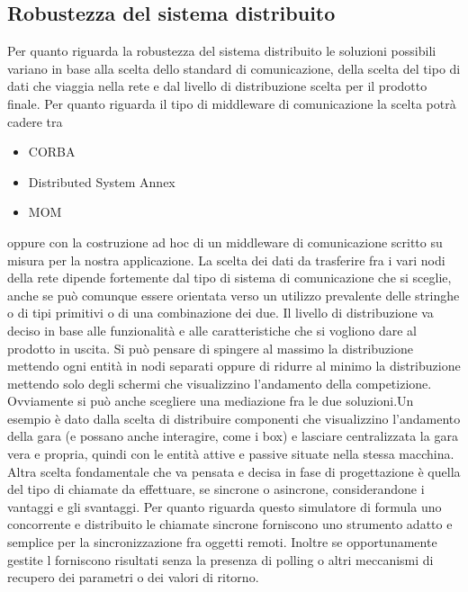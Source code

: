 \subsection{Robustezza del sistema distribuito }
Per quanto riguarda la robustezza del sistema distribuito le soluzioni possibili
variano in base alla scelta dello standard di comunicazione, della scelta del
tipo di dati che viaggia nella rete e dal livello di distribuzione scelta per il
prodotto finale.
Per quanto riguarda il tipo di middleware di comunicazione la scelta potr\`{a}
cadere tra 
\begin{itemize}
\item CORBA
\item Distributed System Annex 
\item MOM
\end{itemize}
oppure con la costruzione ad hoc di un middleware di comunicazione scritto su
misura per la nostra applicazione.
La scelta dei dati da trasferire fra i vari nodi della rete dipende fortemente
dal tipo di sistema di comunicazione che si sceglie, anche se può comunque
essere orientata verso un utilizzo prevalente delle stringhe o di tipi primitivi
o di una combinazione dei due. Il livello di distribuzione va deciso in base
alle funzionalit\`{a} e alle caratteristiche che si vogliono dare al prodotto in
uscita. Si può pensare di spingere al massimo la distribuzione mettendo ogni
entit\`{a} in nodi separati oppure di ridurre al minimo la distribuzione
mettendo solo degli schermi che visualizzino l'andamento della competizione.
Ovviamente si pu\`{o} anche scegliere una mediazione fra le due soluzioni.Un
esempio \`{e} dato dalla scelta di distribuire componenti che visualizzino
l'andamento della gara (e possano anche interagire, come i box) e lasciare
centralizzata la gara vera e propria, quindi con le entit\`{a} attive e passive
situate nella stessa macchina. Altra scelta fondamentale che va pensata e decisa
in fase di progettazione \`{e} quella del tipo di chiamate da effettuare, se
sincrone o asincrone, considerandone i vantaggi e gli svantaggi. Per quanto
riguarda questo simulatore di formula uno concorrente e distribuito le chiamate
sincrone forniscono uno strumento adatto e semplice per la sincronizzazione fra
oggetti remoti. Inoltre se opportunamente gestite l forniscono risultati senza
la presenza di polling o altri meccanismi di recupero dei parametri o dei valori
di ritorno.
